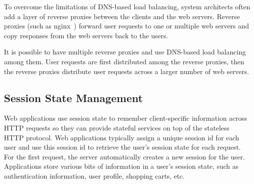 To overcome the limitations of DNS-based load balancing, system architects often 
add a layer of reverse proxies between the clients and the web servers. 
Reverse proxies (such as nginx~\cite{nginx})  forward user requests to one or
multiple web servers and copy responses from the web servers back to the users.

It is possible to have multiple reverse proxies and use DNS-based load
balancing among them.  User requests are
first distributed among the reverse proxies, then  the reverse proxies
distribute user requests across a larger number of web servers.






\subsection{Session State Management}

Web applications use session state to remember client-specific information across HTTP requests
so they can provide stateful services on top of the stateless HTTP protocol.
Web applications typically assign a unique session id for each user and 
use this session id to retrieve the user's session state for each request.
For the first request, the server automatically creates a new session for the user.
Applications store various bits of information in a user's session state,
such as authentication information, user profile, shopping carts, etc.

